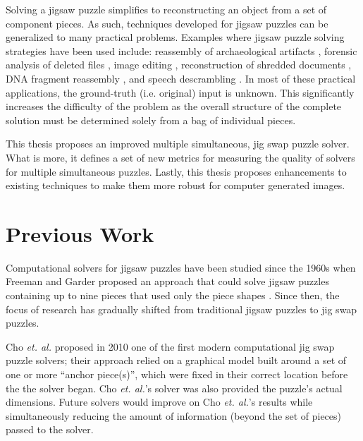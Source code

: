\documentclass{report}
\begin{document}
Solving a jigsaw puzzle simplifies to reconstructing an object from a set of component pieces.  As such, techniques developed for jigsaw puzzles can be generalized to many practical problems.  Examples where jigsaw puzzle solving strategies have been used include: reassembly of archaeological artifacts \cite{brown2008, koller2006}, forensic analysis of deleted files \cite{garfinkel2010}, image editing \cite{cho2008}, reconstruction of shredded documents \cite{zhu2008}, DNA fragment reassembly \cite{marande2007}, and speech descrambling \cite{zhao2007}.  In most of these practical applications, the ground-truth (i.e. original) input  is unknown.  This significantly increases the difficulty of the problem as the overall structure of the complete solution must be determined solely from a bag of individual pieces.

This thesis proposes an improved multiple simultaneous, jig swap puzzle solver.  What is more, it defines a set of new metrics for measuring the quality of solvers for multiple simultaneous puzzles.  Lastly, this thesis  proposes enhancements to existing techniques to make them more robust for computer generated images.







\pagebreak
\section{Previous Work}\label{sec:previousWork}

Computational solvers for jigsaw puzzles have been studied since the 1960s when Freeman and Garder proposed an approach that could solve jigsaw puzzles containing up to nine pieces that used only the piece shapes \cite{freeman1964}.  Since then, the focus of research has gradually shifted from traditional jigsaw puzzles to jig swap puzzles.  

Cho \textit{et. al.} \citep{cho2010} proposed in 2010 one of the first modern computational jig swap puzzle solvers; their approach relied on a graphical model built around a set of one or more ``anchor piece(s)'', which were fixed in their correct location before the the solver began.  Cho \textit{et. al.}'s solver was also provided the puzzle's actual dimensions.  Future solvers would improve on Cho \textit{et. al.}'s results while simultaneously reducing the amount of information (beyond the set of pieces) passed to the solver.
\end{document}

